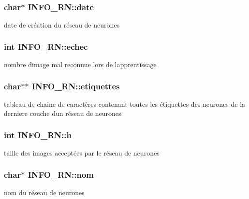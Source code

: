 \subsubsection[{\texorpdfstring{date}{date}}]{\setlength{\rightskip}{0pt plus 5cm}char$\ast$ I\+N\+F\+O\+\_\+\+R\+N\+::date}\hypertarget{structINFO__RN_a35f15519beb59c036debb398bb118f46}{}\label{structINFO__RN_a35f15519beb59c036debb398bb118f46}
date de création du réseau de neurones 
\subsubsection[{\texorpdfstring{echec}{echec}}]{\setlength{\rightskip}{0pt plus 5cm}int I\+N\+F\+O\+\_\+\+R\+N\+::echec}\hypertarget{structINFO__RN_a7be6e5b6b85d6f54701cfcb4decf5f4e}{}\label{structINFO__RN_a7be6e5b6b85d6f54701cfcb4decf5f4e}
nombre d\textquotesingle{}image mal reconnue lors de l\textquotesingle{}apprentissage 
\subsubsection[{\texorpdfstring{etiquettes}{etiquettes}}]{\setlength{\rightskip}{0pt plus 5cm}char$\ast$$\ast$ I\+N\+F\+O\+\_\+\+R\+N\+::etiquettes}\hypertarget{structINFO__RN_abc9704518ac93f743cfebf1baa32a80b}{}\label{structINFO__RN_abc9704518ac93f743cfebf1baa32a80b}
tableau de chaine de caractères contenant toutes les étiquettes des neurones de la derniere couche d\textquotesingle{}un réseau de neurones 
\subsubsection[{\texorpdfstring{h}{h}}]{\setlength{\rightskip}{0pt plus 5cm}int I\+N\+F\+O\+\_\+\+R\+N\+::h}\hypertarget{structINFO__RN_ac0d2599d6266859202d791a041f14ae3}{}\label{structINFO__RN_ac0d2599d6266859202d791a041f14ae3}
taille des images acceptées par le réseau de neurones 
\subsubsection[{\texorpdfstring{nom}{nom}}]{\setlength{\rightskip}{0pt plus 5cm}char$\ast$ I\+N\+F\+O\+\_\+\+R\+N\+::nom}\hypertarget{structINFO__RN_a703843a6712fdf0f2b04cd5b809c644c}{}\label{structINFO__RN_a703843a6712fdf0f2b04cd5b809c644c}
nom du réseau de neurones 
